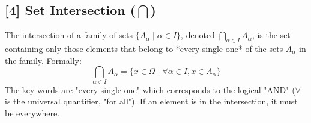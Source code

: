 \documentclass[11pt,a4paper]{article}
\begin{document}
\hypertarget{ref4}{\subsection*{[4] Set Intersection ($\bigcap$)}}
The intersection of a family of sets $\{A_\alpha \mid \alpha \in I\}$, denoted $\bigcap_{\alpha \in I} A_\alpha$, is the set containing only those elements that belong to *every single one* of the sets $A_\alpha$ in the family. Formally:
$$ \bigcap_{\alpha \in I} A_\alpha = \{ x \in \Omega \mid \forall \alpha \in I, x \in A_\alpha \} $$
The key words are "every single one" which corresponds to the logical "AND" ($\forall$ is the universal quantifier, "for all"). If an element is in the intersection, it must be everywhere.
\end{document}
